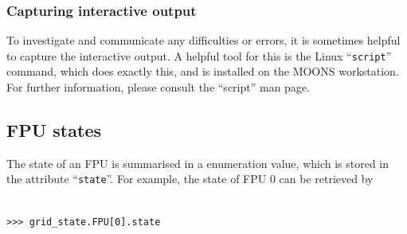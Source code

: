 \documentclass[11pt,a4paper]{scrartcl}
\begin{document}
\subsubsection*{Capturing interactive output}
  To
investigate and communicate any difficulties or errors, it is
sometimes helpful to capture the interactive output. A helpful tool
for this is the Linux ``\texttt{script}'' command, which does exactly
this, and is installed on the MOONS workstation.  For further
information, please consult the ``script'' man page.



\subsection{FPU states}
  
 
 The state of an
FPU is summarised in a enumeration value, which is stored in the
attribute ``\texttt{state}''. For example, the state of FPU 0 can be
retrieved by

\begin{verbatim}

>>> grid_state.FPU[0].state
\end{verbatim}
\end{document}
